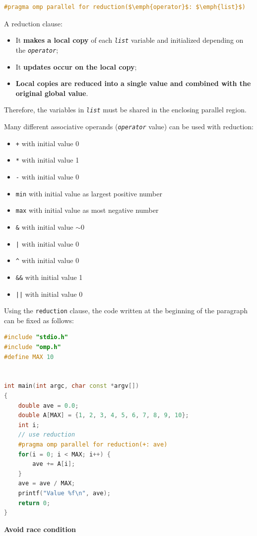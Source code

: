 \begin{openmpbox}
    \begin{lstlisting}[language=C++, mathescape=true]
#pragma omp parallel for reduction($\emph{operator}$: $\emph{list}$)\end{lstlisting}
\end{openmpbox}

\noindent
A reduction clause:
\begin{itemize}
    \item It \textbf{makes a local copy} of each \texttt{\emph{list}} variable and initialized depending on the \texttt{\emph{operator}};
    \item It \textbf{updates occur on the local copy};
    \item \textbf{Local copies are reduced into a single value and combined with the original global value}.
\end{itemize}
Therefore, the variables in \texttt{\emph{list}} must be shared in the enclosing parallel region.

\highspace
Many different associative operands (\texttt{\emph{operator}} value) can be used with reduction:
\begin{itemize}
    \item \texttt{+} with initial value 0
    \item \texttt{*} with initial value 1
    \item \texttt{-} with initial value 0
    \item \texttt{min} with initial value as largest positive number
    \item \texttt{max} with initial value as most negative number
    \item \texttt{\&} with initial value $\sim0$
    \item \texttt{|} with initial value 0
    \item \texttt{\textasciicircum} with initial value 0
    \item \texttt{\&\&} with initial value 1
    \item \texttt{||} with initial value 0
\end{itemize}
Using the \texttt{reduction} clause, the code written at the beginning of the paragraph can be fixed as follows:
\begin{center}
\begin{lstlisting}[language=C++]
#include "stdio.h"
#include "omp.h"
#define MAX 10


int main(int argc, char const *argv[])
{
    double ave = 0.0;
    double A[MAX] = {1, 2, 3, 4, 5, 6, 7, 8, 9, 10};
    int i;
    // use reduction
    #pragma omp parallel for reduction(+: ave)
    for(i = 0; i < MAX; i++) {
        ave += A[i];
    }
    ave = ave / MAX;
    printf("Value %f\n", ave);
    return 0;
}
\end{lstlisting}
\textcolor{Green3}{ \textbf{Avoid race condition}}
\end{center}

